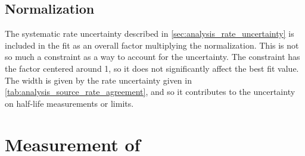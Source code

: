 \documentclass[herrin-thesis.tex]{subfiles}
\begin{document}
\subsection{Normalization}
The systematic rate uncertainty described in \cref{sec:analysis_rate_uncertainty} is included in the fit as an overall factor multiplying the normalization. This is not so much a constraint as a way to account for the uncertainty. The constraint has the factor centered around 1, so it does not significantly affect the best fit value. The width is given by the rate uncertainty given in \cref{tab:analysis_source_rate_agreement}, and so it contributes to the uncertainty on half-life measurements or limits.

\section{Measurement of \texorpdfstring{\twonu{}}{two-neutrino-emitting double beta decay}}
\label{sec:analysis_twonu_measurement}
\end{document}
